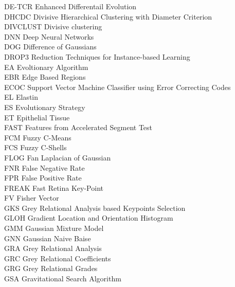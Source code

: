 \begin{nomenclature}
\begin{tabbing}
DE-TCR	\> \quad \quad\quad	Enhanced Differentail Evolution	\\
DHCDC	\> \quad \quad\quad	Divisive Hierarchical Clustering with Diameter Criterion	\\
DIVCLUST	\> \quad \quad\quad	Divisive clustering	\\
DNN	\> \quad \quad\quad	Deep Neural Networks	\\
DOG	\> \quad \quad\quad	Difference of Gaussians	\\
DROP3	\> \quad \quad\quad	Reduction Techniques for Instance-based Learning	\\
EA	\> \quad \quad\quad	Evoltionary Algorithm	\\
EBR	\> \quad \quad\quad	Edge Based Regions	\\
ECOC	\> \quad \quad\quad	Support Vector Machine Classifier using Error Correcting Codes	\\
EL	\> \quad \quad\quad	Elastin	\\
ES	\> \quad \quad\quad	Evolutionary Strategy	\\
ET	\> \quad \quad\quad	Epithelial Tissue	\\
FAST	\> \quad \quad\quad	Features from Accelerated Segment Test	\\
FCM	\> \quad \quad\quad	Fuzzy C-Means	\\
FCS	\> \quad \quad\quad	Fuzzy C-Shells	\\
FLOG	\> \quad \quad\quad	Fan Laplacian of Gaussian	\\
FNR	\> \quad \quad\quad	False Negative Rate	\\
FPR	\> \quad \quad\quad	False Positive Rate	\\
FREAK	\> \quad \quad\quad	 Fast Retina Key-Point	\\
FV	\> \quad \quad\quad	Fisher Vector	\\
GKS	\> \quad \quad\quad	Grey Relational Analysis based Keypoints Selection	\\
GLOH	\> \quad \quad\quad	Gradient Location and Orientation Histogram	\\
GMM	\> \quad \quad\quad	 Gaussian Mixture Model	\\
GNN	\> \quad \quad\quad	Gaussian Naive Baise 	\\
GRA	\> \quad \quad\quad	Grey Relational Analysis	\\
GRC	\> \quad \quad\quad	Grey Relational Coefficients	\\
GRG	\> \quad \quad\quad	Grey Relational Grades	\\
GSA	\> \quad \quad\quad	Gravitational Search Algorithm	\\

\end{tabbing}
\end{nomenclature}
